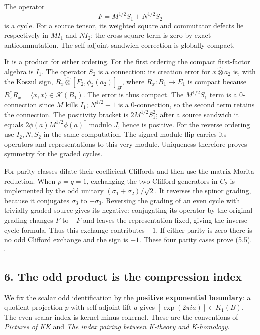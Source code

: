 \documentclass[
  11pt,
]{article}
\begin{document}
The operator \[
F=M^{1/2}S_1+N^{1/2}S_2
\] is a cycle. For a source tensor, its weighted square and commutator
defects lie respectively in \(MI_1\) and \(NI_2\); the cross square term
is zero by exact anticommutation. The self-adjoint sandwich correction
is globally compact.

It is a product for either ordering. For the first ordering the compact
first-factor algebra is \(I_1\). The operator \(S_2\) is a connection:
its creation error for \(x\widehat\otimes a_2\) is, with the Koszul
sign, \(R_x\widehat\otimes[F_2,\phi_2(a_2)]_{\mathrm{gr}}\), where
\(R_x:B_1\to E_1\) is compact because
\(R_x^*R_x=\langle x,x\rangle\in\mathcal K(B_1)\). The error is thus
compact. The \(M^{1/2}S_1\) term is a \(0\)-connection since \(M\) kills
\(I_1\); \(N^{1/2}-1\) is a \(0\)-connection, so the second term retains
the connection. The positivity bracket is \(2M^{1/2}S_1^2\); after a
source sandwich it equals \(2\phi(a)M^{1/2}\phi(a)^*\) modulo \(J\),
hence is positive. For the reverse ordering use \(I_2,N,S_2\) in the
same computation. The signed module flip carries its operators and
representations to this very module. Uniqueness therefore proves
symmetry for the graded cycles.

For parity classes dilate their coefficient Cliffords and then use the
matrix Morita reduction. When \(p=q=1\), exchanging the two Clifford
generators in \(C_2\) is implemented by the odd unitary
\((\sigma_1+\sigma_2)/\sqrt2\). It reverses the spinor grading, because
it conjugates \(\sigma_3\) to \(-\sigma_3\). Reversing the grading of an
even cycle with trivially graded source gives its negative: conjugating
its operator by the original grading changes \(F\) to \(-F\) and leaves
the representation fixed, giving the inverse-cycle formula. Thus this
exchange contributes \(-1\). If either parity is zero there is no odd
Clifford exchange and the sign is \(+1\). These four parity cases prove
(5.5). \(\square\)

\subsection{6. The odd product is the compression
index}\label{the-odd-product-is-the-compression-index}

We fix the scalar odd identification by the \textbf{positive exponential
boundary}: a quotient projection \(p\) with self-adjoint lift \(a\)
gives \([\exp(2\pi i a)]\in K_1(B)\). The even scalar index is kernel
minus cokernel. These are the conventions of \emph{Pictures of KK} and
\emph{The index pairing between K-theory and K-homology}.
\end{document}
